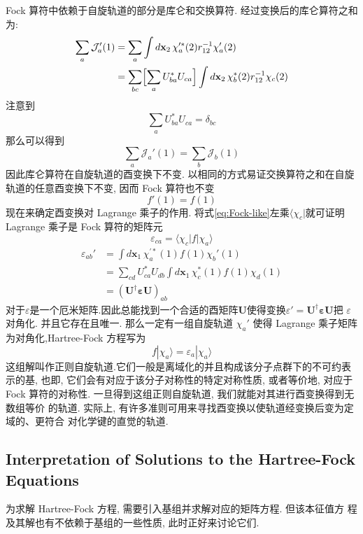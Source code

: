 \documentclass[fontset=none,12pt,a4paper]{ctexart}
\numberwithin{equation}{section}
\begin{document}
 Fock 算符中依赖于自旋轨道的部分是库仑和交换算符. 经过变换后的库仑算符之和为:
\begin{align*}
  \sum_a\mathcal{J}_a'(1) &= \sum_a \int d\mathbf{x}_2\, \chi_a^{\prime*}(2) r_{12}^{-1} \chi_a'(2) \\
  &= \sum_{bc}\Bigl[\sum_a U_{ba}^* U_{ca}\Bigr] \int d\mathbf{x}_2\, \chi_b^*(2) r_{12}^{-1} \chi_c(2)
\end{align*}
注意到
\begin{equation}
  \sum_a U_{ba}^*U_{ca}=\delta_{bc}
\end{equation}
那么可以得到
\begin{equation}
  \sum_a\mathcal{J}_a'(1)=\sum_b\mathcal{J}_b(1)
\end{equation}
因此库仑算符在自旋轨道的酉变换下不变. 以相同的方式易证交换算符之和在自旋轨道的任意酉变换下不变, 因而 Fock 算符也不变
\begin{equation}
  f'(1)=f(1)
\end{equation}
现在来确定酉变换对 Lagrange 乘子的作用. 将式\ref{eq:Fock-like}左乘$\langle\chi_c|$就可证明 Lagrange 乘子是 Fock 算符的矩阵元
\begin{equation}
  \varepsilon_{ca}=\langle\chi_c|f|\chi_a\rangle
\end{equation}
\begin{equation}
  \begin{aligned}
    \varepsilon_{ab}' &= \int d\mathbf{x}_1\,\chi_a^{\prime*}(1)f(1)\chi_b'(1) \\
    &= \sum_{cd} U_{ca}^*U_{db} \int d\mathbf{x}_1\,\chi_c^*(1)f(1)\chi_d(1) \\
    &= (\mathbf{U^\dagger\varepsilon U})_{ab}
  \end{aligned}
\end{equation}
对于$\varepsilon$是一个厄米矩阵.因此总能找到一个合适的酉矩阵$\mathbf{U}$使得变换$\varepsilon'=\mathbf{U^\dagger\varepsilon U}$把
$\varepsilon$对角化.
并且它存在且唯一. 那么一定有一组自旋轨道 ${\chi_a'}$ 使得 Lagrange 乘子矩阵为对角化,Hartree-Fock 方程写为
\begin{equation}
  f|\chi_a\rangle=\varepsilon_a|\chi_a\rangle
\end{equation}
这组解叫作正则自旋轨道.它们一般是离域化的并且构成该分子点群下的不可约表 示的基, 也即, 
它们会有对应于该分子对称性的特定对称性质, 或者等价地, 对应于 Fock 算符的对称性. 
一旦得到这组正则自旋轨道, 我们就能对其进行酉变换得到无数组等价 的轨道. 
实际上, 有许多准则可用来寻找酉变换以使轨道经变换后变为定域的、更符合 对化学键的直觉的轨道.
\subsection{Interpretation of Solutions to the Hartree-Fock Equations}
为求解 Hartree-Fock 方程, 需要引入基组并求解对应的矩阵方程. 但该本征值方 程及其解也有不依赖于基组的一些性质, 此时正好来讨论它们.
\end{document}
